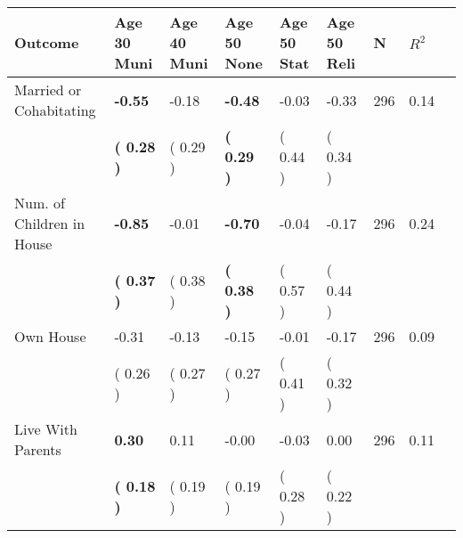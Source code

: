 \begin{tabular}{L{6.2cm} C{1.8cm} C{1.8cm} C{1.8cm} C{1.8cm} C{1.8cm} C{1.8cm} C{0.3cm} C{0.3cm}}
\toprule
 \textbf{Outcome} & \textbf{Age 30 Muni} & \textbf{Age 40 Muni} & \textbf{Age 50 None} & \textbf{Age 50 Stat} & \textbf{Age 50 Reli} & \textbf{N} & \textbf{$ R^2$} \\
\midrule
Married or Cohabitating & \textbf{    -0.55} &     -0.18 & \textbf{    -0.48} &     -0.03 &     -0.33  & 296 &       0.14 \\ 
 & \textbf{(     0.28 )} & (     0.29 ) & \textbf{(     0.29 )} & (     0.44 ) & (     0.34 )  & \\
Num. of Children in House & \textbf{    -0.85} &     -0.01 & \textbf{    -0.70} &     -0.04 &     -0.17  & 296 &       0.24 \\ 
 & \textbf{(     0.37 )} & (     0.38 ) & \textbf{(     0.38 )} & (     0.57 ) & (     0.44 )  & \\
Own House &     -0.31 &     -0.13 &     -0.15 &     -0.01 &     -0.17  & 296 &       0.09 \\ 
 & (     0.26 ) & (     0.27 ) & (     0.27 ) & (     0.41 ) & (     0.32 )  & \\
Live With Parents & \textbf{     0.30} &      0.11 &     -0.00 &     -0.03 &      0.00  & 296 &       0.11 \\ 
 & \textbf{(     0.18 )} & (     0.19 ) & (     0.19 ) & (     0.28 ) & (     0.22 )  & \\
\bottomrule
\end{tabular}
